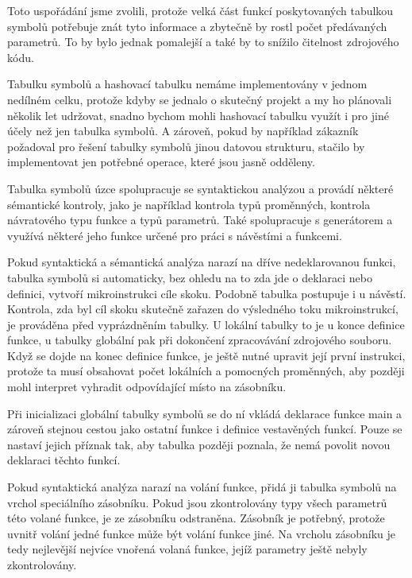 Toto uspořádání jsme zvolili, protože velká část funkcí poskytovaných tabulkou symbolů potřebuje znát tyto informace a zbytečně by rostl počet předávaných parametrů. To by bylo jednak pomalejší a také by to snížilo čitelnost zdrojového kódu.

Tabulku symbolů a hashovací tabulku nemáme implementovány v jednom nedílném celku, protože kdyby se jednalo o skutečný projekt a my ho plánovali několik let udržovat, snadno bychom mohli hashovací tabulku využít i pro jiné účely než jen tabulka symbolů. A zároveň, pokud by například zákazník požadoval pro řešení tabulky symbolů jinou datovou strukturu, stačilo by implementovat jen potřebné operace, které jsou jasně odděleny.

Tabulka symbolů úzce spolupracuje se syntaktickou analýzou a provádí některé sémantické kontroly, jako je například kontrola typů proměnných, kontrola návratového typu funkce a typů parametrů. Také spolupracuje s generátorem a využívá některé jeho funkce určené pro práci s návěstími a funkcemi.

Pokud syntaktická a sémantická analýza narazí na dříve nedeklarovanou funkci, tabulka symbolů si automaticky, bez ohledu na to zda jde o deklaraci nebo definici, vytvoří mikroinstrukci cíle skoku. Podobně tabulka postupuje i u návěstí. Kontrola, zda byl cíl skoku skutečně zařazen do výsledného toku mikroinstrukcí, je prováděna před vyprázdněním tabulky. U lokální tabulky to je u konce definice funkce, u tabulky globální pak při dokončení zpracovávání zdrojového souboru. Když se dojde na konec definice funkce, je ještě nutné upravit její první instrukci, protože ta musí obsahovat počet lokálních a pomocných proměnných, aby později mohl interpret vyhradit odpovídající místo na zásobníku.

Při inicializaci globální tabulky symbolů se do ní vkládá deklarace funkce main a zároveň stejnou cestou jako ostatní funkce i definice vestavěných funkcí. Pouze se nastaví jejich příznak tak, aby tabulka později poznala, že nemá povolit novou deklaraci těchto funkcí.

Pokud syntaktická analýza narazí na volání funkce, přidá ji tabulka symbolů na vrchol speciálního zásobníku. Pokud jsou zkontrolovány typy všech parametrů této volané funkce, je ze zásobníku odstraněna. Zásobník je potřebný, protože uvnitř volání jedné funkce může být volání funkce jiné. Na vrcholu zásobníku je tedy nejlevější nejvíce vnořená volaná funkce, jejíž parametry ještě nebyly zkontrolovány.
